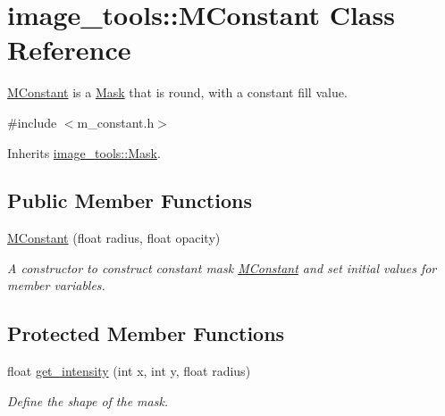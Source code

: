 \hypertarget{classimage__tools_1_1MConstant}{}\section{image\+\_\+tools\+:\+:M\+Constant Class Reference}
\label{classimage__tools_1_1MConstant}


\hyperlink{classimage__tools_1_1MConstant}{M\+Constant} is a \hyperlink{classimage__tools_1_1Mask}{Mask} that is round, with a constant fill value.  




{\ttfamily \#include $<$m\+\_\+constant.\+h$>$}



Inherits \hyperlink{classimage__tools_1_1Mask}{image\+\_\+tools\+::\+Mask}.

\subsection*{Public Member Functions}
\begin{DoxyCompactItemize}
\item 
\hyperlink{classimage__tools_1_1MConstant_aa7ed8862e2011c527ce7589b76267edb}{M\+Constant} (float radius, float opacity)\hypertarget{classimage__tools_1_1MConstant_aa7ed8862e2011c527ce7589b76267edb}{}\label{classimage__tools_1_1MConstant_aa7ed8862e2011c527ce7589b76267edb}

\begin{DoxyCompactList}\small\item\em A constructor to construct constant mask \hyperlink{classimage__tools_1_1MConstant}{M\+Constant} and set initial values for member variables. \end{DoxyCompactList}\end{DoxyCompactItemize}
\subsection*{Protected Member Functions}
\begin{DoxyCompactItemize}
\item 
float \hyperlink{classimage__tools_1_1MConstant_a7d559b8473355bf08910b86e0da73de3}{get\+\_\+intensity} (int x, int y, float radius)
\begin{DoxyCompactList}\small\item\em Define the shape of the mask. \end{DoxyCompactList}\end{DoxyCompactItemize}


